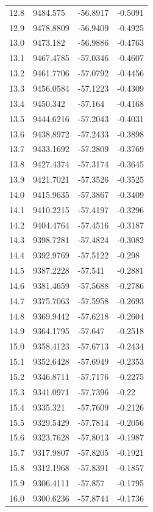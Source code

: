\begin{table}[H]
\begin{tabular}{llll}
12.8 & 9484.575 & -56.8917 & -0.5091 \\
12.9 & 9478.8809 & -56.9409 & -0.4925 \\
13.0 & 9473.182 & -56.9886 & -0.4763 \\
13.1 & 9467.4785 & -57.0346 & -0.4607 \\
13.2 & 9461.7706 & -57.0792 & -0.4456 \\
13.3 & 9456.0584 & -57.1223 & -0.4309 \\
13.4 & 9450.342 & -57.164 & -0.4168 \\
13.5 & 9444.6216 & -57.2043 & -0.4031 \\
13.6 & 9438.8972 & -57.2433 & -0.3898 \\
13.7 & 9433.1692 & -57.2809 & -0.3769 \\
13.8 & 9427.4374 & -57.3174 & -0.3645 \\
13.9 & 9421.7021 & -57.3526 & -0.3525 \\
14.0 & 9415.9635 & -57.3867 & -0.3409 \\
14.1 & 9410.2215 & -57.4197 & -0.3296 \\
14.2 & 9404.4764 & -57.4516 & -0.3187 \\
14.3 & 9398.7281 & -57.4824 & -0.3082 \\
14.4 & 9392.9769 & -57.5122 & -0.298 \\
14.5 & 9387.2228 & -57.541 & -0.2881 \\
14.6 & 9381.4659 & -57.5688 & -0.2786 \\
14.7 & 9375.7063 & -57.5958 & -0.2693 \\
14.8 & 9369.9442 & -57.6218 & -0.2604 \\
14.9 & 9364.1795 & -57.647 & -0.2518 \\
15.0 & 9358.4123 & -57.6713 & -0.2434 \\
15.1 & 9352.6428 & -57.6949 & -0.2353 \\
15.2 & 9346.8711 & -57.7176 & -0.2275 \\
15.3 & 9341.0971 & -57.7396 & -0.22 \\
15.4 & 9335.321 & -57.7609 & -0.2126 \\
15.5 & 9329.5429 & -57.7814 & -0.2056 \\
15.6 & 9323.7628 & -57.8013 & -0.1987 \\
15.7 & 9317.9807 & -57.8205 & -0.1921 \\
15.8 & 9312.1968 & -57.8391 & -0.1857 \\
15.9 & 9306.4111 & -57.857 & -0.1795 \\
16.0 & 9300.6236 & -57.8744 & -0.1736 \\

\end{tabular}
\end{table}
